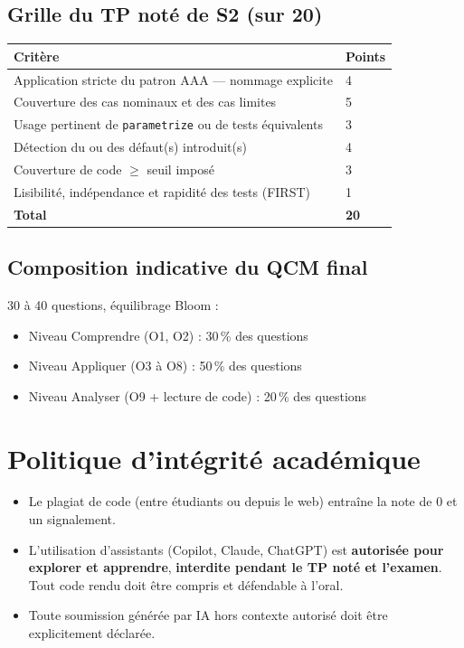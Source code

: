 \documentclass[11pt,a4paper]{article}
\begin{document}
\subsection{Grille du TP noté de S2 (sur 20)}

\begin{tabularx}{\linewidth}{@{}X C{1.5cm}@{}}
\toprule
\textbf{Critère} & \textbf{Points} \\
\midrule
Application stricte du patron AAA --- nommage explicite & 4 \\
Couverture des cas nominaux et des cas limites & 5 \\
Usage pertinent de \texttt{parametrize} ou de tests équivalents & 3 \\
Détection du ou des défaut(s) introduit(s) & 4 \\
Couverture de code $\geq$ seuil imposé & 3 \\
Lisibilité, indépendance et rapidité des tests (FIRST) & 1 \\
\midrule
\textbf{Total} & \textbf{20} \\
\bottomrule
\end{tabularx}

\subsection{Composition indicative du QCM final}

30 à 40 questions, équilibrage Bloom :
\begin{itemize}
    \item Niveau Comprendre (O1, O2) : 30\,\% des questions
    \item Niveau Appliquer (O3 à O8) : 50\,\% des questions
    \item Niveau Analyser (O9 + lecture de code) : 20\,\% des questions
\end{itemize}

\section{Politique d'intégrité académique}

\begin{itemize}
    \item Le plagiat de code (entre étudiants ou depuis le web) entraîne la note de 0 et un signalement.
    \item L'utilisation d'assistants (Copilot, Claude, ChatGPT) est \textbf{autorisée pour explorer et apprendre}, \textbf{interdite pendant le TP noté et l'examen}. Tout code rendu doit être compris et défendable à l'oral.
    \item Toute soumission générée par IA hors contexte autorisé doit être explicitement déclarée.
\end{itemize}
\end{document}
